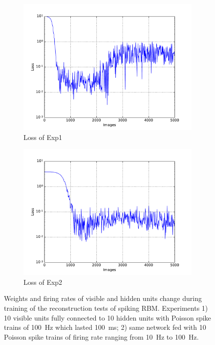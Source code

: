 \begin{figure}
\begin{subfigure}[t]{0.4\textwidth}
		\includegraphics[width=\textwidth]{pics_sdlm/10_exp_SRBM_Orig/exp1_mse_nons.pdf}
		\caption{Loss of Exp1}
	\end{subfigure}
	\begin{subfigure}[t]{0.4\textwidth}
		\includegraphics[width=\textwidth]{pics_sdlm/10_exp_SRBM_Orig/exp2_mse_nons.pdf}
		\caption{Loss of Exp2}
	\end{subfigure}
	\caption{Weights and firing rates of visible and hidden units change during training of the reconstruction tests of spiking RBM. 
		Experiments 1) 10 visible units fully connected to 10 hidden units with Poisson spike trains of 100~Hz which lasted 100~ms; 2) same network fed with 10 Poisson spike trains of firing rate ranging from 10~Hz to 100~Hz.}
\end{figure}

